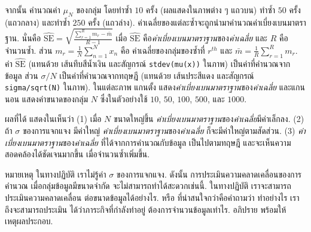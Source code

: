\begin{Exercise}
จากนั้น 
คำนวณค่า $\mu_N$ ของกลุ่ม โดยทำซ้ำ 
$10$ ครั้ง (ผลแสดงในภาพต่าง ๆ แถวบน)
ทำซ้ำ $50$ ครั้ง (แถวกลาง)
และทำซ้ำ $250$ ครั้ง (แถวล่าง).
ค่าเฉลี่ยของแต่ละซ้ำจะถูกนำมาคำนวณค่าเบี่ยงเบนมาตราฐาน.
นั่นคือ $\widehat{\mathrm{SE}} = \sqrt{\frac{\sum_{r=1}^R m_r - \bar{m}}{R - 1} }$
เมื่อ
$\widehat{\mathrm{SE}}$ คือ\textit{ค่าเบี่ยงเบนมาตราฐาน}ของ\textit{ค่าเฉลี่ย} 
และ
$R$ คือ จำนวนซ้ำ.
ส่วน $m_r = \frac{1}{N} \sum_{n=1}^N x_n$ 
คือ ค่าเฉลี่ยของกลุ่มของซ้ำที่ $r^{th}$
และ $\bar{m} = \frac{1}{R} \sum_{r=1}^R m_r$.
ค่า $\widehat{\mathrm{SE}}$
(แทนด้วย เส้นทึบสีน้ำเงิน และสัญกรณ์ \verb|stdev(mu(x))| ในภาพ)
เป็นค่าที่คำนวณจากข้อมูล
ส่วน $\sigma/N$ เป็นค่าที่คำนวณจากทฤษฎี
(แทนด้วย เส้นประสีแดง และสัญกรณ์ \verb|sigma/sqrt(N)| ในภาพ).
ในแต่ละภาพ แกนตั้ง แสดง\textit{ค่าเบี่ยงเบนมาตราฐาน}ของ\textit{ค่าเฉลี่ย}
และแกนนอน แสดงค่าขนาดของกลุ่ม $N$ ซึ่งในตัวอย่างใช้ $10$, $50$, $100$, $500$, และ $1000$.

ผลที่ได้ แสดงในเห็นว่า
(1) เมื่อ $N$ ขนาดใหญ่ขึ้น \textit{ค่าเบี่ยงเบนมาตราฐาน}ของ\textit{ค่าเฉลี่ย}มีค่าเล็กลง.
(2) ถ้า $\sigma$ ของการแจกแจง มีค่าใหญ่ 
\textit{ค่าเบี่ยงเบนมาตราฐาน}ของ\textit{ค่าเฉลี่ย} ก็จะมีค่าใหญ่ตามสัดส่วน.
(3) \textit{ค่าเบี่ยงเบนมาตราฐาน}ของ\textit{ค่าเฉลี่ย} ที่ได้จากการคำนวณกับข้อมูล เป็นไปตามทฤษฎี
และจะเห็นความสอดคล้องได้ชัดเจนมากขึ้น เมื่อจำนวนซ้ำเพิ่มขึ้น.

หมายเหตุ ในทางปฏิบัติ เราไม่รู้ค่า $\sigma$ ของการแจกแจง.
ดังนั้น การประเมินความคลาดเคลื่อนของการคำนวณ เมื่อกลุ่มข้อมูลมีขนาดจำกัด จะไม่สามารถทำได้สะดวกเช่นนี้.
ในทางปฏิบัติ เราจะสามารถประเมินความคลาดเคลื่อน ต่อขนาดข้อมูลได้อย่างไร.
หรือ ที่น่าสนใจกว่าคือคำถามว่า
ทำอย่างไร เราถึงจะสามารถประเมิน ได้ว่าภาระกิจที่กำลังทำอยู่ ต้องการจำนวนข้อมูลเท่าไร.
อภิปราย พร้อมให้เหตุผลประกอบ.


\end{Exercise}


